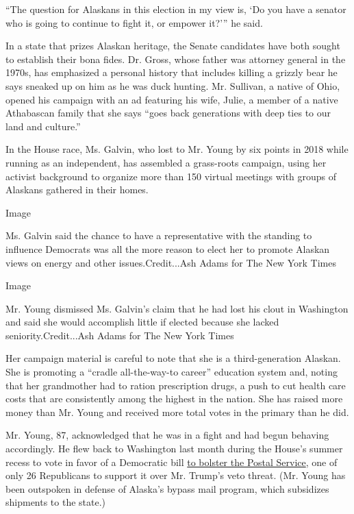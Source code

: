 ``The question for Alaskans in this election in my view is, `Do you have
a senator who is going to continue to fight it, or empower it?''' he
said.

In a state that prizes Alaskan heritage, the Senate candidates have both
sought to establish their bona fides. Dr. Gross, whose father was
attorney general in the 1970s, has emphasized a personal history that
includes killing a grizzly bear he says sneaked up on him as he was duck
hunting. Mr. Sullivan, a native of Ohio, opened his campaign with an ad
featuring his wife, Julie, a member of a native Athabascan family that
she says ``goes back generations with deep ties to our land and
culture.''

In the House race, Ms. Galvin, who lost to Mr. Young by six points in
2018 while running as an independent, has assembled a grass-roots
campaign, using her activist background to organize more than 150
virtual meetings with groups of Alaskans gathered in their homes.

Image

Ms. Galvin said the chance to have a representative with the standing to
influence Democrats was all the more reason to elect her to promote
Alaskan views on energy and other issues.Credit...Ash Adams for The New
York Times

Image

Mr. Young dismissed Ms. Galvin's claim that he had lost his clout in
Washington and said she would accomplish little if elected because she
lacked seniority.Credit...Ash Adams for The New York Times

Her campaign material is careful to note that she is a third-generation
Alaskan. She is promoting a ``cradle all-the-way-to career'' education
system and, noting that her grandmother had to ration prescription
drugs, a push to cut health care costs that are consistently among the
highest in the nation. She has raised more money than Mr. Young and
received more total votes in the primary than he did.

Mr. Young, 87, acknowledged that he was in a fight and had begun
behaving accordingly. He flew back to Washington last month during the
House's summer recess to vote in favor of a Democratic bill
\href{https://www.nytimes3xbfgragh.onion/2020/08/22/us/politics/usps-bill-congress-vote.html}{to
bolster the Postal Service}, one of only 26 Republicans to support it
over Mr. Trump's veto threat. (Mr. Young has been outspoken in defense
of Alaska's bypass mail program, which subsidizes shipments to the
state.)

